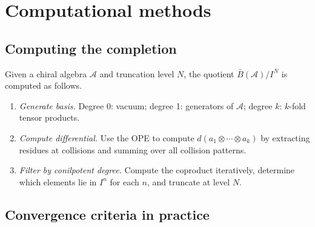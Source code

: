 \section{Computational methods}

\subsection{Computing the completion}

\begin{remark}\label{alg:compute-completion}
Given a chiral algebra $\mathcal{A}$ and truncation level $N$, the quotient $\bar{B}(\mathcal{A})/I^N$ is computed as follows.
\begin{enumerate}
\item \emph{Generate basis.} Degree 0: vacuum; degree 1: generators of $\mathcal{A}$; degree $k$: $k$-fold tensor products.
\item \emph{Compute differential.} Use the OPE to compute $d(a_1 \otimes \cdots \otimes a_k)$ by extracting residues at collisions and summing over all collision patterns.
\item \emph{Filter by conilpotent degree.} Compute the coproduct iteratively, determine which elements lie in $I^n$ for each $n$, and truncate at level $N$.
\end{enumerate}
\end{remark}

\subsection{Convergence criteria in practice}

